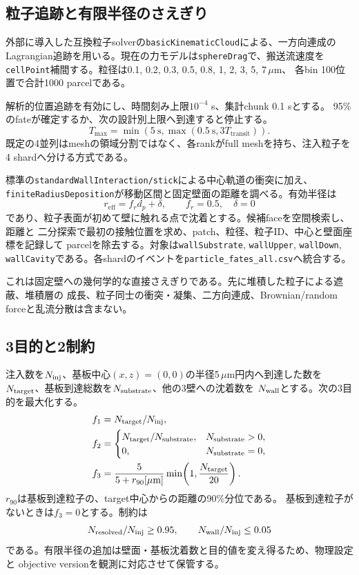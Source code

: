 \documentclass[a4paper,11pt]{article}
\newcommand{\code}[1]{\texttt{#1}}
\begin{document}
\subsection{粒子追跡と有限半径のさえぎり}

外部に導入した互換粒子solverの\code{basicKinematicCloud}による、一方向連成の
Lagrangian追跡を用いる。現在の力モデルは\code{sphereDrag}で、搬送流速度を
\code{cellPoint}補間する。粒径は0.1, 0.2, 0.3, 0.5, 0.8, 1, 2, 3, 5, 7\,$\mu$m、
各bin 100位置で合計1000 parcelである。

解析的位置追跡を有効にし、時間刻み上限$10^{-4}$ s、集計chunk 0.1 sとする。
95\%のfateが確定するか、次の設計別上限へ到達すると停止する。
\[
 T_{\max}=\min\!\left(5\ \mathrm{s},\max\!\left(0.5\ \mathrm{s},3T_{\mathrm{transit}}\right)\right).
\]
既定の4並列はmeshの領域分割ではなく、各rankがfull meshを持ち、注入粒子を
4 shardへ分ける方式である。

標準の\code{standardWallInteraction/stick}による中心軌道の衝突に加え、
\code{finiteRadiusDeposition}が移動区間と固定壁面の距離を調べる。有効半径は
\[
 r_{\mathrm{eff}}=f_r d_p+\delta,\qquad f_r=0.5,\quad\delta=0
\]
であり、粒子表面が初めて壁に触れる点で沈着とする。候補faceを空間検索し、距離と
二分探索で最初の接触位置を求め、patch、粒径、粒子ID、中心と壁面座標を記録して
parcelを除去する。対象は\code{wallSubstrate}, \code{wallUpper}, \code{wallDown},
\code{wallCavity}である。各shardのイベントを\code{particle\_fates\_all.csv}へ統合する。

これは固定壁への幾何学的な直接さえぎりである。先に堆積した粒子による遮蔽、堆積層の
成長、粒子同士の衝突・凝集、二方向連成、Brownian/random forceと乱流分散は含まない。

\subsection{3目的と2制約}

注入数を$N_{\rm inj}$、基板中心$(x,z)=(0,0)$の半径5\,$\mu$m円内へ到達した数を
$N_{\rm target}$、基板到達総数を$N_{\rm substrate}$、他の3壁への沈着数を
$N_{\rm wall}$とする。次の3目的を最大化する。
\begin{align}
 f_1 &= N_{\rm target}/N_{\rm inj},\\
 f_2 &= \begin{cases}
 N_{\rm target}/N_{\rm substrate}, & N_{\rm substrate}>0,\\
 0, & N_{\rm substrate}=0,
 \end{cases}\\
 f_3 &= \frac{5}{5+r_{90}[\mu\mathrm{m}]}
       \min\!\left(1,\frac{N_{\rm target}}{20}\right).
\end{align}
$r_{90}$は基板到達粒子の、target中心からの距離の90\%分位である。
基板到達粒子がないときは$f_3=0$とする。制約は
\[
 N_{\rm resolved}/N_{\rm inj}\geq0.95,\qquad
 N_{\rm wall}/N_{\rm inj}\leq0.05
\]
である。有限半径の追加は壁面・基板沈着数と目的値を変え得るため、物理設定と
objective versionを観測に対応させて保管する。
\end{document}
